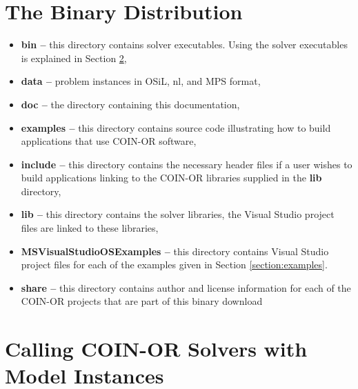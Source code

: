 \documentclass[11pt]{article}
\renewcommand{\_}{{\char"5F}}
\renewcommand{\{}{{\char"7B}}
\renewcommand{\}}{{\char"7D}}
\renewcommand{\^}{{\char"0D}}
\renewcommand{\'}{{\char"0D}}
\begin{document}
\newpage




\section{The Binary Distribution}\label{section:distribution}

\begin{itemize}
\item {\bf bin --} this directory contains  solver executables. Using the solver executables is explained in Section \ref{section:callingsolvers},

\item {\bf data --} problem instances in OSiL, nl, and MPS format,

\item {\bf doc --} the directory containing this documentation,

\item {\bf examples --} this directory contains source code illustrating how to build applications that use COIN-OR software, 

\item {\bf include -- } this directory contains the necessary header files if a user wishes to build applications linking to the COIN-OR libraries supplied in the {\bf lib} directory,

\item {\bf lib --} this directory contains the solver libraries, the Visual Studio project files are linked to these libraries,


\item {\bf MSVisualStudioOSExamples -- } this directory contains Visual Studio  project files for each of the examples given  in Section \ref{section:examples}.


\item {\bf share --}  this directory contains author and license information for each of the  COIN-OR projects that are part of this binary download
\end{itemize}

\section{Calling COIN-OR Solvers with Model Instances}\label{section:callingsolvers}
\end{document}
